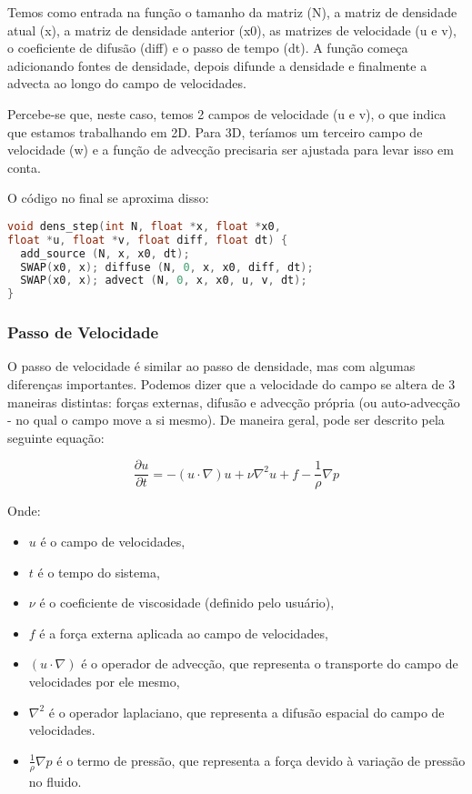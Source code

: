 Temos como entrada na função o tamanho da matriz (N), a matriz de densidade atual (x), a matriz de densidade anterior (x0), as matrizes de velocidade (u e v), o coeficiente de difusão (diff) e o passo de tempo (dt). A função começa adicionando fontes de densidade, depois difunde a densidade e finalmente a advecta ao longo do campo de velocidades.

Percebe-se que, neste caso, temos 2 campos de velocidade (u e v), o que indica que estamos trabalhando em 2D. Para 3D, teríamos um terceiro campo de velocidade (w) e a função de advecção precisaria ser ajustada para levar isso em conta.

O código no final se aproxima disso:
\begin{lstlisting}[language=C]
void dens_step(int N, float *x, float *x0, 
float *u, float *v, float diff, float dt) {
  add_source (N, x, x0, dt);
  SWAP(x0, x); diffuse (N, 0, x, x0, diff, dt);
  SWAP(x0, x); advect (N, 0, x, x0, u, v, dt);
}
\end{lstlisting}


\subsubsection*{Passo de Velocidade}
O passo de velocidade é similar ao passo de densidade, mas com algumas diferenças importantes. Podemos dizer que a velocidade do campo se altera de 3 maneiras distintas: forças externas, difusão e advecção própria (ou auto-advecção - no qual o campo move a si mesmo). De maneira geral, pode ser descrito pela seguinte equação:

$$\frac{\partial u}{\partial t} = - (u \cdot \nabla) u + \nu \nabla^2 u + f - \frac{1}{\rho} \nabla p$$

Onde:
\begin{itemize}
  \item $u$ é o campo de velocidades,
  \item $t$ é o tempo do sistema,
  \item $\nu$ é o coeficiente de viscosidade (definido pelo usuário),
  \item $f$ é a força externa aplicada ao campo de velocidades,
  \item $(u \cdot \nabla)$ é o operador de advecção, que representa o transporte do campo de velocidades por ele mesmo,
  \item $\nabla^2$ é o operador laplaciano, que representa a difusão espacial do campo de velocidades.
  \item $\frac{1}{\rho} \nabla p$ é o termo de pressão, que representa a força devido à variação de pressão no fluido.
\end{itemize}

